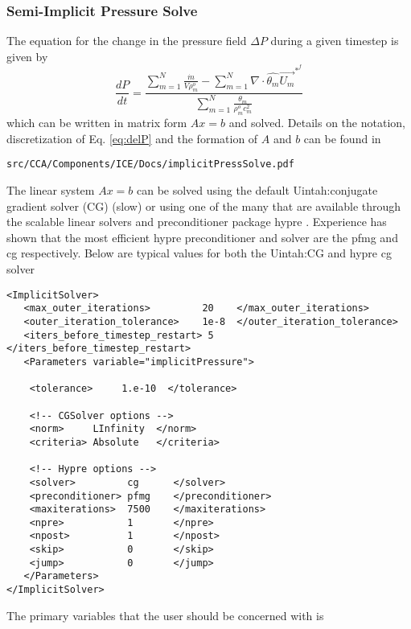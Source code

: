 \normalsize
\subsubsection{Semi-Implicit Pressure Solve}
The equation for the change in the pressure field $\Delta{P}$ during a given
timestep is given by
%
\begin{equation}
    \label{eq:delP}
     \frac{dP}{dt} = 
     \frac{\sum \limits_{{m}=1}^N  \frac{\dot{m}} {V \rho^{o}_m} 
        -  \sum \limits_{{m}=1}^N \nabla \cdot \widehat{\theta_m} \vec{U_m}^{*^{f}}}
          {\sum \limits_{{m}=1}^N \frac{\theta_m}{\rho^{o}_m c_m^2} }
\end{equation}
%
which can be written in matrix form $Ax = b$ and solved.  Details on the
notation, discretization of Eq. \ref{eq:delP} and the formation of $A$
and $b$ can be found in
%
\begin{Verbatim}[fontsize=\footnotesize]
 src/CCA/Components/ICE/Docs/implicitPressSolve.pdf
\end{Verbatim}
%
The linear system $Ax = b$ can be solved using the default Uintah:conjugate
gradient solver (CG) (slow) or using one of the many that are available
through the scalable linear solvers and preconditioner package hypre
\cite{ref:hypre}. Experience has shown that the most efficient hypre
preconditioner and solver are the pfmg and cg respectively.  Below are
typical values for both the Uintah:CG and hypre cg solver
%
\begin{Verbatim}[fontsize=\footnotesize]
<ImplicitSolver>
   <max_outer_iterations>         20    </max_outer_iterations>
   <outer_iteration_tolerance>    1e-8  </outer_iteration_tolerance>
   <iters_before_timestep_restart> 5    </iters_before_timestep_restart>
   <Parameters variable="implicitPressure">

    <tolerance>     1.e-10  </tolerance>
    
    <!-- CGSolver options -->
    <norm>     LInfinity  </norm>
    <criteria> Absolute   </criteria>

    <!-- Hypre options -->
    <solver>         cg      </solver>
    <preconditioner> pfmg    </preconditioner>
    <maxiterations>  7500    </maxiterations>
    <npre>           1       </npre>
    <npost>          1       </npost>
    <skip>           0       </skip>
    <jump>           0       </jump>
   </Parameters>
</ImplicitSolver>
\end{Verbatim}
%
The primary variables that the user should be concerned with is
